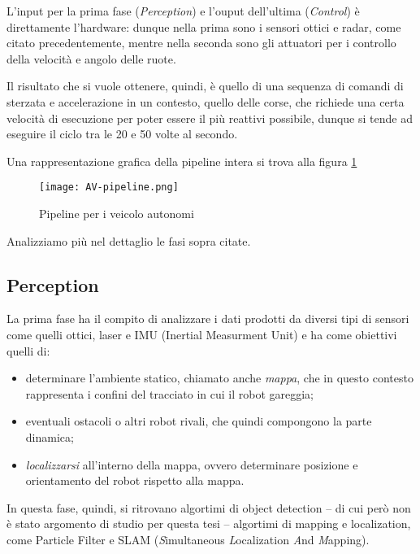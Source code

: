 L'input per la prima fase (\textit{Perception}) e l'ouput dell'ultima (\textit{Control})
è direttamente l'hardware: dunque nella prima sono i sensori ottici e radar, come citato precedentemente,
mentre nella seconda sono gli attuatori per i controllo della velocità e angolo delle ruote.

Il risultato che si vuole ottenere, quindi, è quello di una sequenza di comandi di sterzata e accelerazione
in un contesto, quello delle corse, che richiede una certa velocità di esecuzione per poter essere
il più reattivi possibile, dunque si tende ad eseguire il ciclo tra le 20 e 50 volte al secondo.

\noindent Una rappresentazione grafica della pipeline intera si trova alla figura \ref{fig:av-pipeline}\\
\begin{figure}[ht]
\centering
\caption{Pipeline per i veicolo autonomi}
\texttt{[image: AV-pipeline.png]}
\label{fig:av-pipeline}
\end{figure}

Analizziamo più nel dettaglio le fasi sopra citate.
\subsection{Perception}
La prima fase ha il compito di analizzare i dati prodotti da diversi tipi di sensori come quelli
ottici, laser e IMU (Inertial Measurment Unit) e ha come obiettivi quelli di:
\begin{itemize}
	\item determinare l'ambiente statico, chiamato anche \textit{mappa}, che in questo contesto
	      rappresenta i confini del tracciato in cui il robot gareggia;
	\item eventuali ostacoli o altri robot rivali, che quindi compongono la
	      parte dinamica; \item \textit{localizzarsi} all'interno della mappa, ovvero
	      determinare posizione e orientamento del robot rispetto alla mappa.
\end{itemize}

In questa fase, quindi, si ritrovano algortimi di object detection -- di cui però non è stato argomento
di studio per questa tesi -- algortimi di mapping e localization, come Particle Filter e SLAM
(\textit{S}imultaneous \textit{L}ocalization \textit{A}nd \textit{M}apping).

